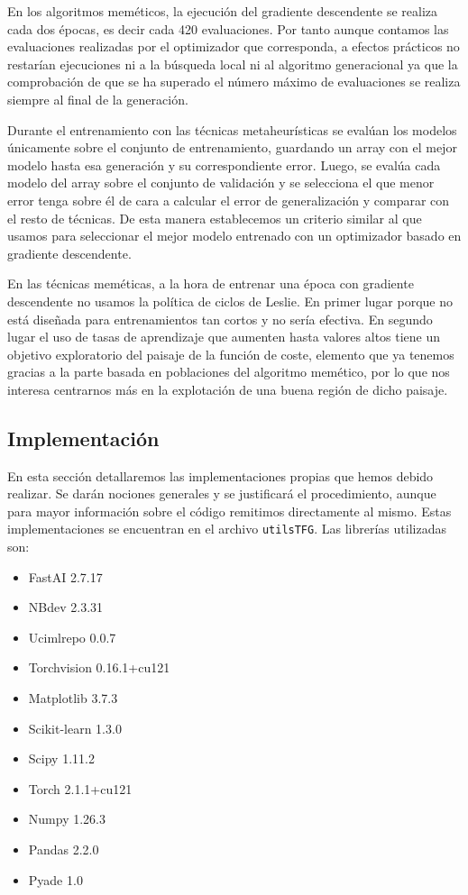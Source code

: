 En los algoritmos meméticos, la ejecución del gradiente descendente se realiza cada dos épocas, es decir cada 420 evaluaciones. Por tanto aunque contamos las evaluaciones realizadas por el optimizador que corresponda, a efectos prácticos no restarían ejecuciones ni a la búsqueda local ni al algoritmo generacional ya que la comprobación de que se ha superado el número máximo de evaluaciones se realiza siempre al final de la generación.


Durante el entrenamiento con las técnicas metaheurísticas se evalúan los modelos únicamente sobre el conjunto de entrenamiento, guardando un array con el mejor modelo hasta esa generación y su correspondiente error. Luego, se evalúa cada modelo del array sobre el conjunto de validación y se selecciona el que menor error tenga sobre él de cara a calcular el error de generalización y comparar con el resto de técnicas. De esta manera establecemos un criterio similar al que usamos para seleccionar el mejor modelo entrenado con un optimizador basado en gradiente descendente.



En las técnicas meméticas, a la hora de entrenar una época con gradiente descendente no usamos la política de ciclos de Leslie. En primer lugar porque no está diseñada para entrenamientos tan cortos y no sería efectiva. En segundo lugar el uso de tasas de aprendizaje que aumenten hasta valores altos tiene un objetivo exploratorio del paisaje de la función de coste, elemento que ya tenemos gracias a la parte basada en poblaciones del algoritmo memético, por lo que nos interesa centrarnos más en la explotación de una buena región de dicho paisaje.


\subsection{Implementación}

En esta sección detallaremos las implementaciones propias que hemos debido realizar. Se darán nociones generales y se justificará el procedimiento, aunque para mayor información sobre el código remitimos directamente al mismo. Estas implementaciones se encuentran en el archivo \verb|utilsTFG|. Las librerías utilizadas son:

\begin{itemize}
	\item FastAI 2.7.17
	\item NBdev 2.3.31
	\item Ucimlrepo 0.0.7
	\item Torchvision 0.16.1+cu121
	\item Matplotlib 3.7.3
	\item Scikit-learn 1.3.0
	\item Scipy 1.11.2
	\item Torch 2.1.1+cu121
	\item Numpy 1.26.3
	\item Pandas 2.2.0	
	\item Pyade 1.0
\end{itemize}

